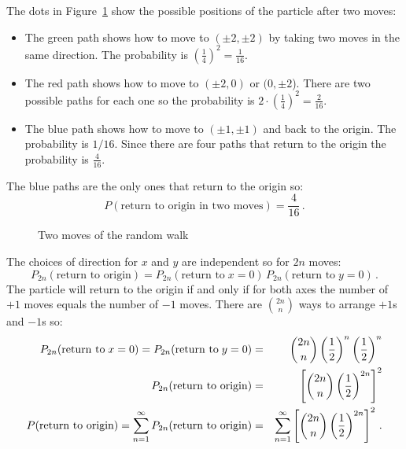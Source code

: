 \solution{}

The dots in Figure~\ref{f.two-moves} show the possible positions of the particle after two moves:
\begin{itemize}
\item The green path shows how to move to $(\pm 2, \pm 2)$ by taking two moves in the same direction. The probability is $\left(\frac{1}{4}\right)^2= \frac{1}{16}$.
\item The red path shows how to move to $(\pm 2,0)$ or $(0,\pm 2$). There are two possible paths for each one so the probability is $2\cdot\left(\frac{1}{4}\right)^2= \frac{2}{16}$.
\item The blue path shows how to move to $(\pm 1,\pm 1)$ and back to the origin. The probability is $1/16$. Since there are four paths that return to the origin the probability is $\frac{4}{16}$.
\end{itemize}
The blue paths are the only ones that return to the origin so:
\[
P(\textrm{return to origin in two moves})=\frac{4}{16}\,.
\]

\begin{figure}[tb]
\begin{center}
\end{center}
\caption{Two moves of the random walk}\label{f.two-moves}
\end{figure}

 The choices of direction for $x$ and $y$ are independent so for $2n$ moves:
\begin{equation}\label{eq.2d-1}
P_{2n}(\textrm{return to origin}) =
P_{2n}(\textrm{return to}\;x=0)\,P_{2n}(\textrm{return to}\;y=0)\,.
\end{equation}
The particle will return to the origin if and only if for both axes the number of $+1$ moves equals the number of $-1$ moves. There are ${2n \choose n}$ ways to arrange $+1$s and $-1$s so:
\begin{eqnarray}
P_{2n}(\textrm{return to}\;x=0) =P_{2n}(\textrm{return to}\;y=0)&=&
\displaystyle{2n \choose n}\left(\displaystyle\frac{1}{2}\right)^n\left(\displaystyle\frac{1}{2}\right)^{n}\\
P_{2n}(\textrm{return to origin}) &=&
\left[\displaystyle{2n \choose n}\left(\displaystyle\frac{1}{2}\right)^{2n}\right]^2\\
P(\textrm{return to origin}) =
\sum_{n=1}^{\infty}P_{2n}(\textrm{return to origin}) &=&
\sum_{n=1}^{\infty}\left[\displaystyle{2n \choose n}\left(\displaystyle\frac{1}{2}\right)^{2n}\right]^2\,.\label{eq.2d-2}
\end{eqnarray}

